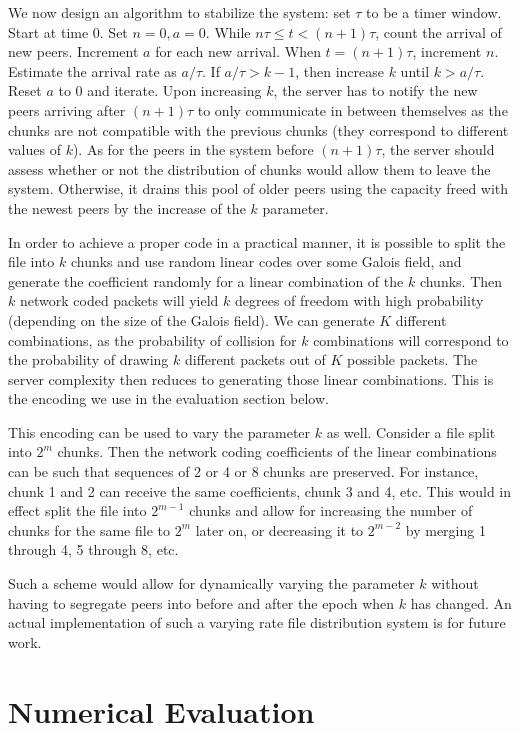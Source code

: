 \documentclass[11pt,conference]{IEEEtran}
\begin{document}
We now design an algorithm to stabilize the system: set $\tau$ to be a timer window. Start at time 0. Set $n=0, a = 0$. While $n \tau \leq t < (n+1) \tau$, count the arrival of new peers. Increment $a$ for each new arrival. When $t = (n+1)\tau$, increment $n$. Estimate the arrival rate as $a/\tau$. If $a/\tau > k-1$, then increase $k$ until $k> a/\tau$. Reset $a$ to 0 and iterate. Upon increasing $k$, the server has to notify the new peers arriving after $(n+1)\tau$ to only communicate in between themselves as the chunks are not compatible with the previous chunks (they correspond to different values of $k$). As for the peers in the system before $(n+1)\tau$, the server should assess whether or not the distribution of chunks would allow them to leave the system. Otherwise, it drains this pool of older peers using the capacity freed with the newest peers by the increase of the $k$ parameter.

In order to achieve a proper code in a practical manner, it is possible to split the file into $k$ chunks and use random linear codes over some Galois field, and generate the coefficient randomly for a linear combination of the $k$ chunks. Then $k$ network coded packets will yield $k$ degrees of freedom with high probability (depending on the size of the Galois field). We can generate $K$ different combinations, as the probability of collision for $k$ combinations will correspond to the probability of drawing $k$ different packets out of $K$ possible packets. The server complexity then reduces to generating those linear combinations. This is the encoding we use in the evaluation section below.

This encoding can be used to vary the parameter $k$ as well. Consider a file split into $2^m$ chunks. Then the network coding coefficients of the linear combinations can be such that sequences of 2 or 4 or 8 chunks are preserved. For instance, chunk 1 and 2 can receive the same coefficients, chunk 3 and 4, etc. This would in effect split the file into $2^{m-1}$ chunks and allow for increasing the number of chunks for the same file to $2^m$ later on, or decreasing it to $2^{m-2}$ by merging 1 through 4, 5 through 8, etc.

Such a scheme would allow for dynamically varying the parameter $k$ without having to segregate peers into before and after the epoch when $k$ has changed. An actual implementation of such a varying rate file distribution system is for future work.




\section{Numerical Evaluation}
\label{sec:num}
\end{document}
